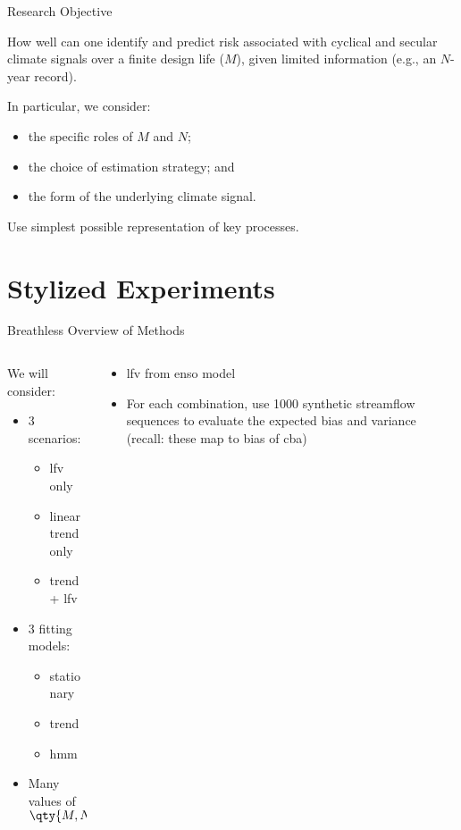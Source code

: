 \documentclass[
  10pt,     %
]{beamer}
\makeatletter
\newcommand*{\eg}{e.g.\@\xspace}
\makeatother
\begin{document}
\begin{frame}{Research Objective}
  \begin{alertblock}{How well can one identify and predict risk}
     associated with cyclical and secular climate signals over a finite design life ($M$),  given limited information (\eg, an $N$-year record).
  \end{alertblock}
  \pause
  In particular, we consider:
  \begin{itemize}
    \item the specific roles of $M$ and $N$;
    \pause\item the choice of estimation strategy; and
    \pause\item the form of the underlying climate signal.
  \end{itemize}
  \pause
  Use simplest possible representation of key processes.
\end{frame}

\section{Stylized Experiments}

\begin{frame}{Breathless Overview of Methods}
  \begin{columns}[T]
    \begin{column}{0.475\textwidth}
      We will consider:
      \begin{itemize}
        \item 3 scenarios:
        \begin{itemize}
          \item \gls{lfv} only
          \item linear trend only
          \item trend + \gls{lfv}
        \end{itemize}
        \item 3 fitting models:
        \begin{itemize}
          \item stationary
          \item trend
          \item \gls{hmm}
        \end{itemize}
        \item Many values of $\qty{M, N}$
      \end{itemize}
    \end{column}
    \pause
    \begin{column}{0.475\textwidth}
      \begin{itemize}
        \item \gls{lfv} from \gls{enso} model \citep{Ramesh:2016hf, Zebiak:1987cl}
        \item For each combination, use \num{1000} synthetic streamflow sequences to evaluate the expected bias and variance (recall: these map to bias of \gls{cba})
      \end{itemize}
    \end{column}
  \end{columns}
\end{frame}
\end{document}
